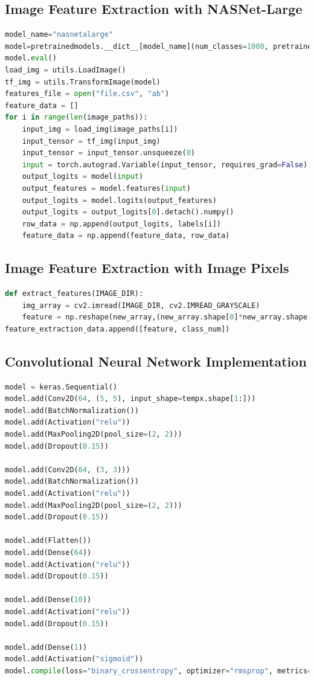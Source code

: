 \documentclass[12pt]{article}
\numberwithin{figure}{section} %
\begin{document}
\subsection{Image Feature Extraction with NASNet-Large}
\begin{lstlisting}[language = Python]
model_name="nasnetalarge"
model=pretrainedmodels.__dict__[model_name](num_classes=1000, pretrained='imagenet')
model.eval()
load_img = utils.LoadImage()
tf_img = utils.TransformImage(model)
features_file = open("file.csv", "ab")
feature_data = []
for i in range(len(image_paths)):
    input_img = load_img(image_paths[i])
    input_tensor = tf_img(input_img)
    input_tensor = input_tensor.unsqueeze(0)
    input = torch.autograd.Variable(input_tensor, requires_grad=False)
    output_logits = model(input)
    output_features = model.features(input)
    output_logits = model.logits(output_features)
    output_logits = output_logits[0].detach().numpy()
    row_data = np.append(output_logits, labels[i])
    feature_data = np.append(feature_data, row_data)
\end{lstlisting}

\subsection{Image Feature Extraction with Image Pixels}
\begin{lstlisting}[language = Python]
def extract_features(IMAGE_DIR): 
    img_array = cv2.imread(IMAGE_DIR, cv2.IMREAD_GRAYSCALE)
    feature = np.reshape(new_array,(new_array.shape[0]*new_array.shape[1]))
feature_extraction_data.append([feature, class_num])  
\end{lstlisting}

\subsection{Convolutional Neural Network Implementation}
\begin{lstlisting}[language = Python]
model = keras.Sequential()
model.add(Conv2D(64, (5, 5), input_shape=tempx.shape[1:]))
model.add(BatchNormalization())
model.add(Activation("relu"))
model.add(MaxPooling2D(pool_size=(2, 2)))
model.add(Dropout(0.15))

model.add(Conv2D(64, (3, 3)))
model.add(BatchNormalization())
model.add(Activation("relu"))
model.add(MaxPooling2D(pool_size=(2, 2)))
model.add(Dropout(0.15))

model.add(Flatten())
model.add(Dense(64))
model.add(Activation("relu"))
model.add(Dropout(0.15))

model.add(Dense(10))
model.add(Activation("relu"))
model.add(Dropout(0.15))

model.add(Dense(1))
model.add(Activation("sigmoid"))
model.compile(loss="binary_crossentropy", optimizer="rmsprop", metrics=["accuracy"])
\end{lstlisting}
\end{document}
